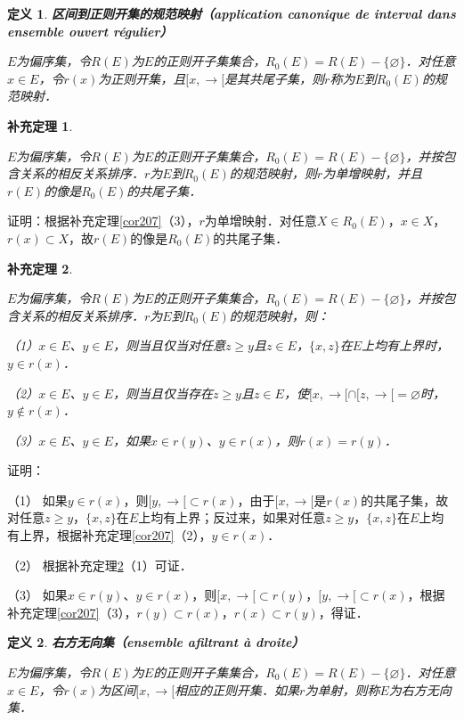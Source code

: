 \documentclass[12pt, a4paper, oneside]{book}
\newtheorem{cor}{补充定理}
\newtheorem{de}{定义}
\begin{document}
			\begin{de}
				\textbf{区间到正则开集的规范映射（application canonique de interval dans ensemble ouvert régulier）}
				\par
				$E$为偏序集，令$R(E)$为$E$的正则开子集集合，$R_0(E)=R(E)-\{\varnothing\}$．对任意$x\in E$，令$r(x)$为正则开集，且$[x, \to [$是其共尾子集，则$r$称为$E$到$R_0(E)$的规范映射．
			\end{de}
			
			\begin{cor}\label{cor210}
				\hfill\par
				$E$为偏序集，令$R(E)$为$E$的正则开子集集合，$R_0(E)=R(E)-\{\varnothing\}$，并按包含关系的相反关系排序．$r$为$E$到$R_0(E)$的规范映射，则$r$为单增映射，并且$r(E)$的像是$R_0(E)$的共尾子集．
			\end{cor}
			证明：根据补充定理\ref{cor207}（3），$r$为单增映射．对任意$X\in R_0(E)$，$x\in X$，$r(x)\subset X$，故$r(E)$的像是$R_0(E)$的共尾子集．			
			
			\begin{cor}\label{cor211}
				\hfill\par
				$E$为偏序集，令$R(E)$为$E$的正则开子集集合，$R_0(E)=R(E)-\{\varnothing\}$，并按包含关系的相反关系排序．$r$为$E$到$R_0(E)$的规范映射，则：
				\par
				（1）$x\in E$、$y\in E$，则当且仅当对任意$z\geq y$且$z\in E$，$\{x, z\}$在$E$上均有上界时，$y\in r(x)$．
				\par
				（2）$x\in E$、$y\in E$，则当且仅当存在$z\geq y$且$z\in E$，使$[x, \to [\cap[z, \to [=\varnothing$时，$y\notin r(x)$．
				\par
				（3）$x\in E$、$y\in E$，如果$x\in r(y)$、$y\in r(x)$，则$r(x)=r(y)$．
			\end{cor}
			证明：
			\par
			（1）	如果$y\in r(x)$，则$[y, \to [\subset r(x)$，由于$[x, \to [$是$r(x)$的共尾子集，故对任意$z\geq y$，$\{x, z\}$在$E$上均有上界；反过来，如果对任意$z\geq y$，$\{x, z\}$在$E$上均有上界，根据补充定理\ref{cor207}（2），$y\in r(x)$．
			\par
			（2）	根据补充定理\ref{cor211}（1）可证．
			\par
			（3）	如果$x\in r(y)$、$y\in r(x)$，则$[x, \to [\subset r(y)$，$[y, \to [\subset r(x)$，根据补充定理\ref{cor207}（3），$r(y)\subset r(x)$，$r(x)\subset r(y)$，得证．

			\begin{de}
				\textbf{右方无向集（ensemble afiltrant à droite）}
				\par
				$E$为偏序集，令$R(E)$为$E$的正则开子集集合，$R_0(E)=R(E)-\{\varnothing\}$．对任意$x\in E$，令$r(x)$为区间$[x, \to [$相应的正则开集．如果$r$为单射，则称$E$为右方无向集．
			\end{de}
			
\end{document}
